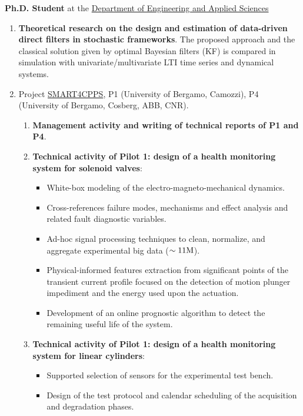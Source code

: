 \documentclass[10pt]{article}
\begin{document}
\begin{minipage}[t]{.80\textwidth}
	\textbf{Ph.D. Student} at the \href{https://disa.unibg.it/}{Department of Engineering and Applied Sciences}
	\begin{enumerate}
		\item \textbf{Theoretical research on the design and estimation of data-driven direct filters in stochastic frameworks}.
		The proposed approach and the classical solution given by optimal Bayesian filters (KF) is compared in simulation with univariate/multivariate LTI time series and dynamical systems.
		\item Project \href{https://www.smart4cpps.it/}{SMART4CPPS}, P1 ({\small University of Bergamo, Camozzi}), P4 ({\small University of Bergamo, Cosberg, ABB, CNR}).
		\begin{enumerate}
			\item \textbf{Management activity and writing of technical reports of P1 and P4}.
			\item \textbf{Technical activity of Pilot 1: design of a health monitoring system for solenoid valves}:
			\begin{itemize}
				\item White-box modeling of the electro-magneto-mechanical dynamics.
				\item Cross-references failure modes, mechanisms and effect analysis and related fault diagnostic variables.
				\item Ad-hoc signal processing techniques to clean, normalize, and aggregate experimental big data ($\sim 11 \textnormal{M}$).
				\item Physical-informed features extraction from significant points of the transient current profile focused on the detection of motion plunger impediment and the energy used upon the actuation.
				\item Development of an online prognostic algorithm to detect the remaining useful life of the system.
			\end{itemize}
			\item \textbf{Technical activity of Pilot 1: design of a health monitoring system for linear cylinders}:
			\begin{itemize}
				\item Supported selection of sensors for the experimental test bench.
				\item Design of the test protocol and calendar scheduling of the acquisition and degradation phases.

\end{itemize}
\end{enumerate}
\end{enumerate}
\end{minipage}
\end{document}
